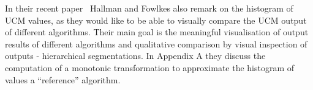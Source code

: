 In their recent paper~\cite{Hallman2014} Hallman and Fowlkes also remark on the histogram of UCM values, as they would like to be able to visually compare the UCM output of different algorithms. Their main goal is the meaningful visualisation of output results of different algorithms and qualitative comparison by visual inspection of outputs - hierarchical segmentations. In Appendix A they discuss the computation of a monotonic transformation to approximate the histogram of values \wrt a ``reference'' algorithm.
